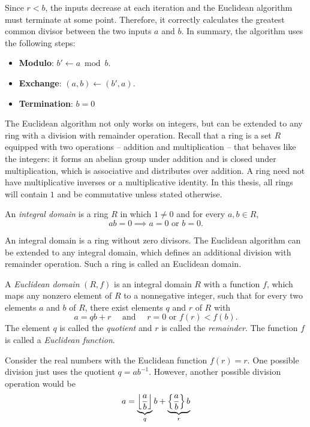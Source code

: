 Since $r < b$, the inputs decrease at each iteration
and the Euclidean algorithm must terminate at some point.
Therefore, it correctly calculates the greatest common divisor between the two
inputs $a$ and $b$.
In summary, the algorithm uses the following steps:
\begin{itemize}
  \item \textbf{Modulo}: $b' ← a \bmod b$.
  \item \textbf{Exchange}: $(a, b) ← (b', a)$.
  \item \textbf{Termination}: $b = 0$
\end{itemize}

The Euclidean algorithm not only works on integers,
but can be extended to any ring with a division with remainder operation.
Recall that a ring is a set $R$ equipped with two operations -- addition and
multiplication -- that behaves like the integers:
it forms an abelian group under addition and is closed under multiplication,
which is associative and distributes over addition.
A ring need not have multiplicative inverses or a multiplicative identity.
In this thesis, all rings will contain $1$ and be commutative unless stated
otherwise.

\begin{definition}
  An \emph{integral domain} is a ring $R$ in which $1 ≠ 0$ and for every $a, b ∈ R$,
  \[
    ab = 0 \implies a = 0 \text{ or } b = 0.
  \]
\end{definition}

An integral domain is a ring without zero divisors.
The Euclidean algorithm can be extended to any integral domain,
which defines an additional division with remainder operation.
Such a ring is called an Euclidean domain.

\begin{definition}
  A \emph{Euclidean domain} $(R, f)$ is an integral domain $R$ with a function $f$,
  which maps any nonzero element of $R$ to a nonnegative integer,
  such that for every two elements $a$ and $b$ of $R$, there exist elements $q$ and $r$ of $R$ with
  \[
    a = qb + r \quad \text{ and } \quad r = 0 \text{ or } f(r) < f(b).
  \]
  The element $q$ is called the \emph{quotient} and $r$ is called the \emph{remainder}.
  The function $f$ is called a \emph{Euclidean function}.
\end{definition}

\begin{example}
  Consider the real numbers with the Euclidean function $f(r) = r$.
  One possible division just uses the quotient $q = ab^{-1}$.
  However,
  another possible division operation would be
  \[
    a = \underbrace{\left\lfloor\frac{a}{b}\right\rfloor}_q b + \underbrace{\left\{ \frac{a}{b} \right\} b}_r
  \]
\end{example}

